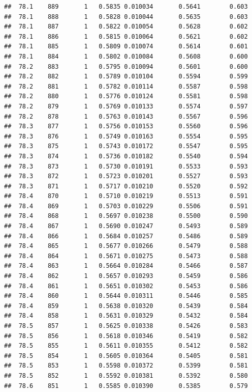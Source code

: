 \documentclass[
]{book}
\begin{document}
\begin{verbatim}
##  78.1    889       1   0.5835 0.010034       0.5641        0.603
##  78.1    888       1   0.5828 0.010044       0.5635        0.603
##  78.1    887       1   0.5822 0.010054       0.5628        0.602
##  78.1    886       1   0.5815 0.010064       0.5621        0.602
##  78.1    885       1   0.5809 0.010074       0.5614        0.601
##  78.1    884       1   0.5802 0.010084       0.5608        0.600
##  78.2    883       1   0.5795 0.010094       0.5601        0.600
##  78.2    882       1   0.5789 0.010104       0.5594        0.599
##  78.2    881       1   0.5782 0.010114       0.5587        0.598
##  78.2    880       1   0.5776 0.010124       0.5581        0.598
##  78.2    879       1   0.5769 0.010133       0.5574        0.597
##  78.2    878       1   0.5763 0.010143       0.5567        0.596
##  78.3    877       1   0.5756 0.010153       0.5560        0.596
##  78.3    876       1   0.5749 0.010163       0.5554        0.595
##  78.3    875       1   0.5743 0.010172       0.5547        0.595
##  78.3    874       1   0.5736 0.010182       0.5540        0.594
##  78.3    873       1   0.5730 0.010191       0.5533        0.593
##  78.3    872       1   0.5723 0.010201       0.5527        0.593
##  78.3    871       1   0.5717 0.010210       0.5520        0.592
##  78.4    870       1   0.5710 0.010219       0.5513        0.591
##  78.4    869       1   0.5703 0.010229       0.5506        0.591
##  78.4    868       1   0.5697 0.010238       0.5500        0.590
##  78.4    867       1   0.5690 0.010247       0.5493        0.589
##  78.4    866       1   0.5684 0.010257       0.5486        0.589
##  78.4    865       1   0.5677 0.010266       0.5479        0.588
##  78.4    864       1   0.5671 0.010275       0.5473        0.588
##  78.4    863       1   0.5664 0.010284       0.5466        0.587
##  78.4    862       1   0.5657 0.010293       0.5459        0.586
##  78.4    861       1   0.5651 0.010302       0.5453        0.586
##  78.4    860       1   0.5644 0.010311       0.5446        0.585
##  78.4    859       1   0.5638 0.010320       0.5439        0.584
##  78.4    858       1   0.5631 0.010329       0.5432        0.584
##  78.5    857       1   0.5625 0.010338       0.5426        0.583
##  78.5    856       1   0.5618 0.010346       0.5419        0.582
##  78.5    855       1   0.5611 0.010355       0.5412        0.582
##  78.5    854       1   0.5605 0.010364       0.5405        0.581
##  78.5    853       1   0.5598 0.010372       0.5399        0.581
##  78.5    852       1   0.5592 0.010381       0.5392        0.580
##  78.6    851       1   0.5585 0.010390       0.5385        0.579

\end{verbatim}
\end{document}
